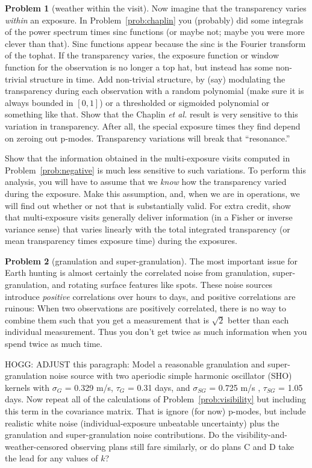 \documentclass{article}
\theoremstyle{definition}
\newcommand{\problemname}{Problem}
\newtheorem{problem}{\problemname}
\newcommand{\probref}[1]{\problemname~\ref{#1}}
\theoremstyle{remark}
\begin{document}
\begin{problem}[weather within the visit]\label{prob:weather}
Now imagine that the transparency varies \emph{within} an exposure.
In \probref{prob:chaplin} you (probably) did some integrals of the power spectrum times sinc functions (or maybe not; maybe you were more clever than that).
Sinc functions appear because the sinc is the Fourier transform of the tophat.
If the transparency varies, the exposure function or window function for the observation is no longer a top hat,
but instead has some non-trivial structure in time.
Add non-trivial structure, by (say) modulating the transparency during each observation with a random polynomial (make sure it is always bounded in $[0,1]$) or a thresholded or sigmoided polynomial or something like that.
Show that the Chaplin \textsl{et al.} result is very sensitive to this variation in transparency.
After all, the special exposure times they find depend on zeroing out p-modes.
Transparency variations will break that ``resonance.''

Show that the information obtained in the multi-exposure visits computed in \probref{prob:negative} is much less sensitive to such variations.
To perform this analysis, you will have to assume that we \emph{know} how the transparency varied during the exposure.
Make this assumption, and, when we are in operations, we will find out whether or not that is substantially valid.
For extra credit, show that multi-exposure visits generally deliver information (in a Fisher or inverse variance sense) that varies linearly with the total integrated transparency (or mean transparency times exposure time) during the exposures.
\end{problem}

\begin{problem}[granulation and super-granulation]\label{prob:gran}
The most important issue for Earth hunting is almost certainly the correlated noise from granulation, super-granulation, and rotating surface features like spots.
These noise sources introduce \emph{positive} correlations over hours to days, and positive correlations are ruinous:
When two observations are positively correlated, there is no way to combine them such that you get a measurement
that is $\sqrt{2}$ better than each individual measurement.
Thus you don't get twice as much information when you spend twice as much time.

HOGG: ADJUST this paragraph:
Model a reasonable granulation and super-granulation noise source with two aperiodic simple harmonic oscillator (SHO) kernels with $\sigma_G$ = 0.329 m/s, $\tau_G$ = 0.31 days, and $\sigma_{SG}$ = 0.725 m/s , $\tau_{SG}$ = 1.05 days. Now repeat all of the calculations of \probref{prob:visibility} but including this term in the covariance matrix.
That is ignore (for now) p-modes, but include realistic white noise (individual-exposure unbeatable uncertainty) plus the granulation and super-granulation noise contributions.
Do the visibility-and-weather-censored observing plans still fare similarly, or do plans C and D take the lead for any values of $k$?
\end{problem}
\end{document}
